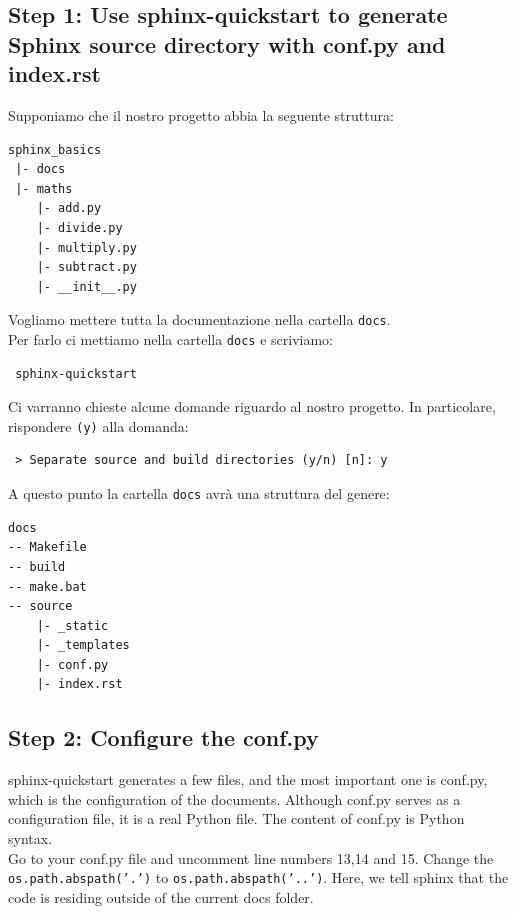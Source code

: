 \subsection{Step 1: Use sphinx-quickstart to generate Sphinx source directory with conf.py and index.rst}

Supponiamo che il nostro progetto abbia la seguente struttura:
\begin{verbatim}
sphinx_basics
 |- docs
 |- maths
    |- add.py
    |- divide.py
    |- multiply.py
    |- subtract.py
    |- __init__.py
\end{verbatim}
Vogliamo mettere tutta la documentazione nella cartella \texttt{docs}.\\
Per farlo ci mettiamo nella cartella \texttt{docs} e scriviamo:

\begin{verbatim}
 sphinx-quickstart
\end{verbatim}

Ci varranno chieste alcune domande riguardo al nostro progetto. In particolare, rispondere \texttt{(y)} alla domanda:

\begin{verbatim}
 > Separate source and build directories (y/n) [n]: y
\end{verbatim}

A questo punto la cartella \texttt{docs} avrà una struttura del genere:

\begin{verbatim}
docs
-- Makefile
-- build
-- make.bat
-- source
    |- _static
    |- _templates
    |- conf.py
    |- index.rst
\end{verbatim}

\subsection{Step 2: Configure the conf.py}

sphinx-quickstart generates a few files, and the most important one is conf.py, which is the configuration of the documents. Although conf.py serves as a configuration file, it is a real Python file. The content of conf.py is Python syntax.\\

Go to your conf.py file and uncomment line numbers 13,14 and 15. Change the \texttt{os.path.abspath('.')} to \texttt{os.path.abspath('..')}. Here, we tell sphinx that the code is residing outside of the current docs folder.\\

